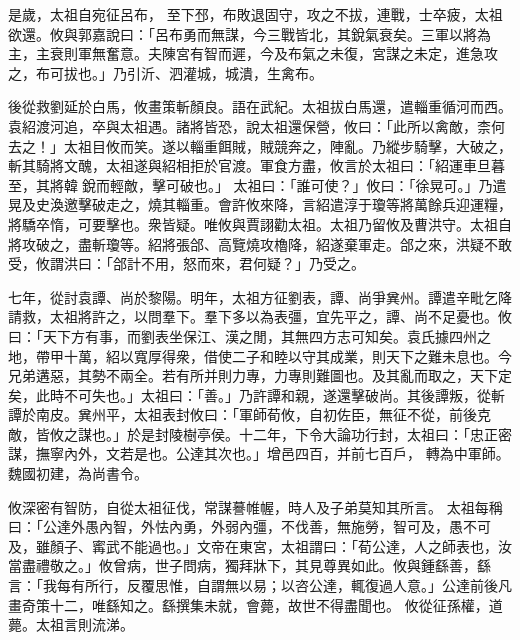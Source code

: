\begin{pinyinscope}
 
是歲，太祖自宛征呂布，
 至下邳，布敗退固守，攻之不拔，連戰，士卒疲，太祖欲還。攸與郭嘉說曰：「呂布勇而無謀，今三戰皆北，其銳氣衰矣。三軍以將為主，主衰則軍無奮意。夫陳宮有智而遲，今及布氣之未復，宮謀之未定，進急攻之，布可拔也。」乃引沂、泗灌城，城潰，生禽布。
 
 
後從救劉延於白馬，攸畫策斬顏良。語在武紀。太祖拔白馬還，遣輜重循河而西。袁紹渡河追，卒與太祖遇。諸將皆恐，說太祖還保營，攸曰：「此所以禽敵，柰何去之！」太祖目攸而笑。遂以輜重餌賊，賊競奔之，陣亂。乃縱步騎擊，大破之，斬其騎將文醜，太祖遂與紹相拒於官渡。軍食方盡，攸言於太祖曰：「紹運車旦暮至，其將韓𦳣銳而輕敵，擊可破也。」
 太祖曰：「誰可使？」攸曰：「徐晃可。」乃遣晃及史渙邀擊破走之，燒其輜重。會許攸來降，言紹遣淳于瓊等將萬餘兵迎運糧，將驕卒惰，可要擊也。衆皆疑。唯攸與賈詡勸太祖。太祖乃留攸及曹洪守。太祖自將攻破之，盡斬瓊等。紹將張郃、高覽燒攻櫓降，紹遂棄軍走。郃之來，洪疑不敢受，攸謂洪曰：「郃計不用，怒而來，君何疑？」乃受之。
 
 
七年，從討袁譚、尚於黎陽。明年，太祖方征劉表，譚、尚爭兾州。譚遣辛毗乞降請救，太祖將許之，以問羣下。羣下多以為表彊，宜先平之，譚、尚不足憂也。攸曰：「天下方有事，而劉表坐保江、漢之閒，其無四方志可知矣。袁氏據四州之地，帶甲十萬，紹以寬厚得衆，借使二子和睦以守其成業，則天下之難未息也。今兄弟遘惡，其勢不兩全。若有所并則力專，力專則難圖也。及其亂而取之，天下定矣，此時不可失也。」太祖曰：「善。」乃許譚和親，遂還擊破尚。其後譚叛，從斬譚於南皮。兾州平，太祖表封攸曰：「軍師荀攸，自初佐臣，無征不從，前後克敵，皆攸之謀也。」於是封陵樹亭侯。十二年，下令大論功行封，太祖曰：「忠正密謀，撫寧內外，文若是也。公達其次也。」增邑四百，并前七百戶，
 轉為中軍師。魏國初建，為尚書令。
 
 
攸深密有智防，自從太祖征伐，常謀謩帷幄，時人及子弟莫知其所言。
 太祖每稱曰：「公達外愚內智，外怯內勇，外弱內彊，不伐善，無施勞，智可及，愚不可及，雖顏子、寗武不能過也。」文帝在東宮，太祖謂曰：「荀公達，人之師表也，汝當盡禮敬之。」攸曾病，世子問病，獨拜牀下，其見尊異如此。攸與鍾繇善，繇言：「我每有所行，反覆思惟，自謂無以易；以咨公達，輒復過人意。」公達前後凡畫奇策十二，唯繇知之。繇撰集未就，會薨，故世不得盡聞也。
 攸從征孫權，道薨。太祖言則流涕。
 

\end{pinyinscope}

